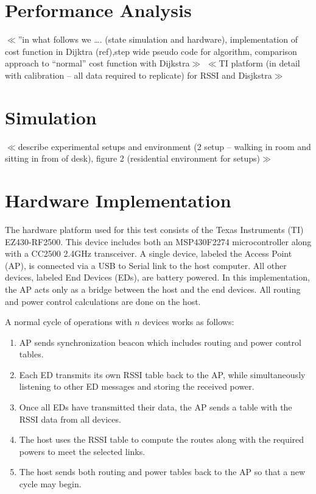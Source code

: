 \documentclass{article}
\begin{document}
\section{Performance Analysis}
$\ll$”in what follows we …. (state simulation and hardware), implementation of cost function in Dijktra (ref),step wide pseudo code for algorithm, comparison approach to “normal” cost function with Dijkstra$\gg$
$\ll$TI platform (in detail with calibration – all data required to replicate) for RSSI and Disjkstra$\gg$

\section{Simulation}
$\ll$describe experimental setups and environment (2 setup – walking in room and sitting in from of desk), figure 2 (residential environment for setups)$\gg$

\section{Hardware Implementation}
The hardware platform used for this test consists of the Texas Instruments (TI) EZ430-RF2500. This device includes both an MSP430F2274 microcontroller along with a CC2500 2.4GHz transceiver. A single device, labeled the Access Point (AP), is connected via a USB to Serial link to the host computer. All other devices, labeled End Devices (EDs), are battery powered. In this implementation, the AP acts only as a bridge between the host and the end devices. All routing and power control calculations are done on the host.

A normal cycle of operations with $n$ devices works as follows:
\begin{enumerate}
\item AP sends synchronization beacon which includes routing and power control tables.
\item Each ED transmits its own RSSI table back to the AP, while simultaneously listening to other ED messages and storing the received power.
\item Once all EDs have transmitted their data, the AP sends a table with the RSSI data from all devices.
\item The host uses the RSSI table to compute the routes along with the required powers to meet the selected links.
\item The host sends both routing and power tables back to the AP so that a new cycle may begin.
\end{enumerate}
\end{document}
